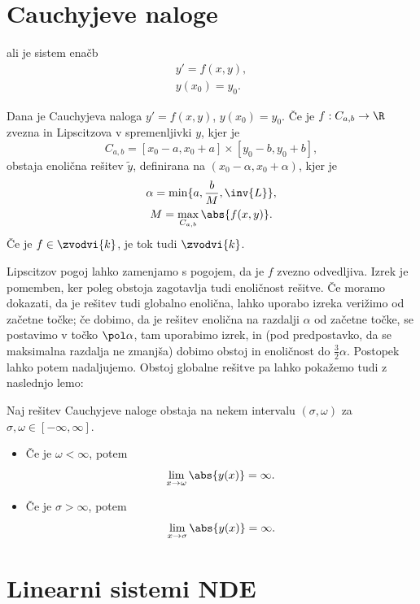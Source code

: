 \section{Cauchyjeve naloge}

 ali  je sistem enačb
\begin{gather*}
  y' = f(x, y), \\
  y(x_0) = y_0.
\end{gather*}

\begin{izrek}
  Dana je Cauchyjeva naloga $y' = f(x, y)$, $y(x_0) = y_0$.
  Če je $f: C_{a,b} \to \R$ zvezna in Lipscitzova v spremenljivki $y$, kjer je
  \[
	C_{a,b} = [x_0 - a, x_0 + a] \times [y_0 - b, y_0 + b],
  \]
  obstaja enolična rešitev $\tilde{y}$, definirana na $(x_0 - \alpha, x_0 +
  \alpha)$, kjer je
  \begin{gather*}
	\alpha = \min\{a, \frac{b}{M}, \inv{L}\}, \\
	M = \max_{C_{a,b}} \abs{f(x, y)}.
  \end{gather*}
  Če je $f \in \zvodvi{k}$, je tok tudi $\zvodvi{k}$.
\end{izrek}

Lipscitzov pogoj lahko zamenjamo s pogojem, da je $f$ zvezno odvedljiva.
Izrek je pomemben, ker poleg obstoja zagotavlja tudi enoličnost rešitve.
Če moramo dokazati, da je rešitev tudi globalno enolična, lahko uporabo izreka
verižimo od začetne točke; če dobimo, da je rešitev enolična na razdalji
$\alpha$ od začetne točke, se postavimo v točko $\pol \alpha$, tam uporabimo
izrek, in (pod predpostavko, da se maksimalna razdalja ne zmanjša) dobimo obstoj
in enoličnost do $\frac{3}{2} \alpha$.
Postopek lahko potem nadaljujemo.
Obstoj globalne rešitve pa lahko pokažemo tudi z naslednjo lemo:

\begin{lema}
  Naj rešitev Cauchyjeve naloge obstaja na nekem intervalu $(\sigma, \omega)$ za
  $\sigma, \omega \in [-\infty, \infty]$.
  \begin{itemize}
  \item Če je $\omega < \infty$, potem
	\[
	  \lim_{x \to \omega} \abs{y(x)} = \infty.
	\]
  \item Če je $\sigma > \infty$, potem
	\[
	  \lim_{x \to \sigma} \abs{y(x)} = \infty.
	\]
  \end{itemize}
\end{lema}

\section{Linearni sistemi NDE}

